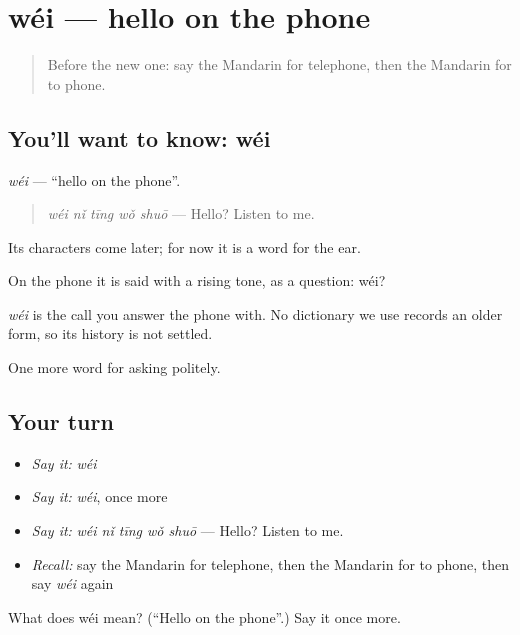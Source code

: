 \section[wéi]{wéi — hello on the phone}

\label{lesson:ZH-C63-wei}



\begin{quote}
Before the new one: say the Mandarin for telephone, then the Mandarin for to phone.
\end{quote}

\subsection*{You'll want to know: wéi}
\emph{wéi} — \textquotedblleft{}hello on the phone\textquotedblright{}.

\begin{quote}
\emph{wéi nǐ tīng wǒ shuō} — Hello? Listen to me.
\end{quote}

Its characters come later; for now it is a word for the ear.

On the phone it is said with a rising tone, as a question: wéi?

\begin{cousinweb}
\emph{wéi} is the call you answer the phone with. No dictionary we use records an older form, so its history is not settled.
\end{cousinweb}

\begin{grammarlens}[title={What you've built}]
One more word for asking politely.
\end{grammarlens}

\subsection*{Your turn}
\begin{itemize}
\raggedright
  \item \emph{Say it:} \emph{wéi}
  \item \emph{Say it:} \emph{wéi}, once more
  \item \emph{Say it:} \emph{wéi nǐ tīng wǒ shuō} — Hello? Listen to me.
  \item \emph{Recall:} say the Mandarin for telephone, then the Mandarin for to phone, then say \emph{wéi} again
\end{itemize}

\begin{tcolorbox}[breakable,colback=teal!4,colframe=teal!35!black,title={Before you move on}]
What does wéi mean? (\textquotedblleft{}Hello on the phone\textquotedblright{}.) Say it once more.
\end{tcolorbox}

